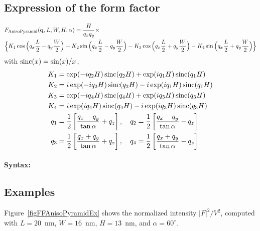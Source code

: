 \subsection{Expression of the form factor}
\begin{align*}
&F_{\rm{AnisoPyramid}}(\mathbf{q}, L, W, H, \alpha)=
\frac{H}{q_xq_y} \times \\
&\Big\{
K_1\cos\Big(q_x \frac{L}{2} -q_y \frac{W}{2}\Big)+  K_2 \sin \Big (q_x
\frac{L}{2}- q_y \frac{W}{2}\Big) - K_3 \cos \Big (q_x \frac{L}{2} +q_y \frac{W}{2}\Big)-
K_4 \sin \Big (q_x \frac{L}{2} + q_y \frac{W}{2}\Big)
\Big\}
\end{align*}
with $\operatorname{sinc}(x)=\sin(x)/x$,
\begin{align*}
K_1 &= \exp(-i q_2 H) \operatorname{sinc}(q_2 H) + \exp(iq_1 H) \operatorname{sinc}(q_1 H) \\
K_2 &= i \exp(-iq_2 H) \operatorname{sinc}(q_2 H) -i \exp(iq_1 H) \operatorname{sinc}(q_1 H) \\
K_3 &= \exp(-iq_4 H) \operatorname{sinc}(q_4 H) + \exp(iq_3 H) \operatorname{sinc}(q_3 H) \\
K_4 &= i \exp(i q_4 H) \operatorname{sinc}(q_4 H) -i \exp(iq_3 H) \operatorname{sinc}(q_3 H)\\
q_1 &= \frac{1}{2}\left[\frac{q_x -q_y}{\tan \alpha} +q_z \right],\quad q_2 = \frac{1}{2}\left[\frac{q_x -q_y}{\tan \alpha} -q_z \right]\\
q_3 &= \frac{1}{2}\left[\frac{q_x +q_y}{\tan \alpha} +q_z \right] , \quad q_4 = \frac{1}{2}\left[\frac{q_x +q_y}{\tan \alpha} -q_z \right]
\end{align*}

\paragraph{Syntax:} 

\subsection{Examples}
Figure~\ref{figFFAnisoPyramidEx} shows the normalized intensity
$|F|^2/V^2$, computed with $L=20$~nm, $W=16$~nm, $H=13$~nm, and
$\alpha=60^{\circ}$.

